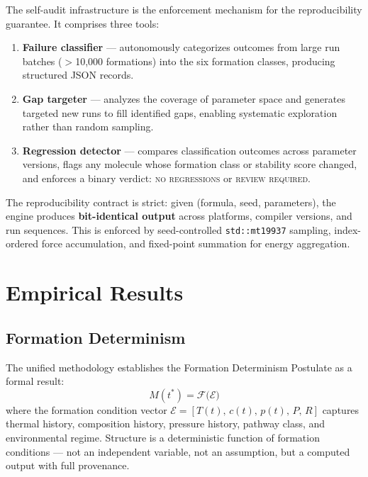 \documentclass[11pt]{article}
\begin{document}
The self-audit infrastructure is the enforcement mechanism for
the reproducibility guarantee.  It comprises three tools:

\begin{enumerate}
\item \textbf{Failure classifier} --- autonomously categorizes
      outcomes from large run batches ($>$10,000 formations) into
      the six formation classes, producing structured JSON records.
\item \textbf{Gap targeter} --- analyzes the coverage of parameter
      space and generates targeted new runs to fill identified gaps,
      enabling systematic exploration rather than random sampling.
\item \textbf{Regression detector} --- compares classification
      outcomes across parameter versions, flags any molecule
      whose formation class or stability score changed, and
      enforces a binary verdict: \textsc{no regressions} or
      \textsc{review required}.
\end{enumerate}

The reproducibility contract is strict: given
(formula, seed, parameters), the engine produces \textbf{bit-identical
output} across platforms, compiler versions, and run sequences.
This is enforced by seed-controlled \texttt{std::mt19937} sampling,
index-ordered force accumulation, and fixed-point summation for
energy aggregation.

\section{Empirical Results}

\subsection{Formation Determinism}

The unified methodology establishes the Formation Determinism
Postulate as a formal result:
\[
\boxed{\;M(t^{*}) = \mathcal{F}\!\bigl(\mathcal{E}\bigr)\;}
\]
where the formation condition vector
$\mathcal{E} = [T(t),\,c(t),\,p(t),\,P,\,R]$ captures thermal
history, composition history, pressure history, pathway class, and
environmental regime.  Structure is a deterministic function of
formation conditions --- not an independent variable, not an
assumption, but a computed output with full provenance.
\end{document}
